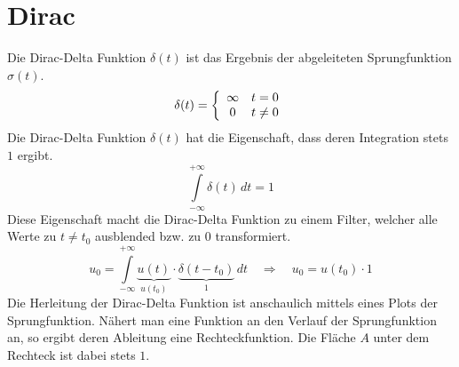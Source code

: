 \section{Dirac}
Die Dirac-Delta Funktion $\delta(t)$ ist das Ergebnis der abgeleiteten
Sprungfunktion $\sigma(t)$.
\[  
    \delta(t) = 
    \left\{ 
        \begin{array}{c c}
            \infty & t=0 \\
            0 & t \neq 0
        \end{array}
    \right.
\]
Die Dirac-Delta Funktion $\delta(t)$ hat die Eigenschaft, dass deren
Integration stets $1$ ergibt.
\[  
        \int\limits_{-\infty}^{+\infty} \delta(t)\,dt = 1
\]
Diese Eigenschaft macht die Dirac-Delta Funktion zu einem Filter, welcher
alle Werte zu $t \neq t_0$ ausblended bzw. zu $0$ transformiert.
\[  
        u_0 = \int\limits_{-\infty}^{+\infty} \underbrace{u(t)}_{u(t_0)} 
                \cdot \underbrace{\delta(t-t_0)}_{1}\,dt 
        \quad \Rightarrow \quad 
        u_0 = u(t_0) \cdot 1
\]
Die Herleitung der Dirac-Delta Funktion ist anschaulich mittels eines
Plots der Sprungfunktion. Nähert man eine Funktion an den Verlauf der
Sprungfunktion an, so ergibt deren Ableitung eine Rechteckfunktion.
Die Fläche $A$ unter dem Rechteck ist dabei stets $1$.

